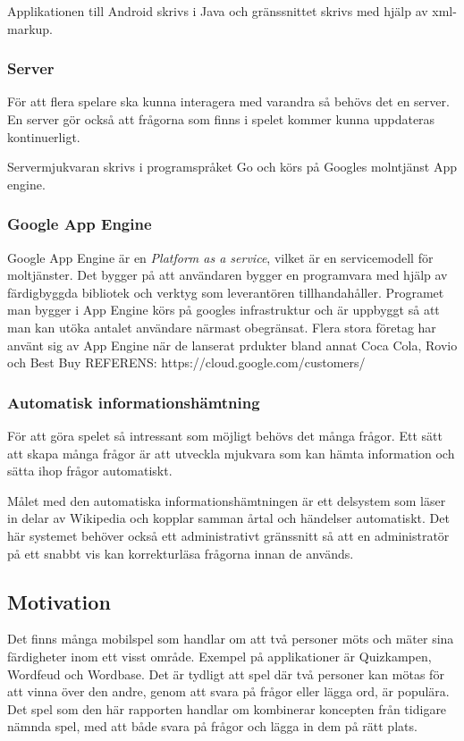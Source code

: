 \documentclass[swedish,12pt,a4paper]{article}
\begin{document}
Applikationen till Android skrivs i Java och gränssnittet skrivs med hjälp av xml-markup.

\subsubsection{Server}
För att flera spelare ska kunna interagera med varandra så behövs det en server. En server gör också att frågorna som finns i spelet kommer kunna uppdateras kontinuerligt.

Servermjukvaran skrivs i programspråket Go och körs på Googles molntjänst App engine.

\subsubsection{Google App Engine} 
Google App Engine är en \textit{Platform as a service}, vilket är en servicemodell för moltjänster. Det bygger på att användaren bygger en programvara med hjälp av färdigbyggda bibliotek och verktyg som leverantören tillhandahåller. Programet man bygger i App Engine körs på googles infrastruktur och är uppbyggt så att man kan utöka antalet användare närmast obegränsat. Flera stora företag har använt sig av App Engine när de lanserat prdukter bland annat Coca Cola, Rovio och Best Buy REFERENS: https://cloud.google.com/customers/

\subsubsection{Automatisk informationshämtning}
För att göra spelet så intressant som möjligt behövs det många frågor. Ett sätt att skapa många frågor är att utveckla mjukvara som kan hämta information och sätta ihop frågor automatiskt. 

Målet med den automatiska informationshämtningen är ett delsystem som läser in delar av Wikipedia och kopplar samman årtal och händelser automatiskt. Det här systemet behöver också ett administrativt gränssnitt så att en administratör på ett snabbt vis kan korrekturläsa frågorna innan de används.

\subsection{Motivation}
Det finns många mobilspel som handlar om att två personer möts och mäter sina färdigheter inom ett visst område. Exempel på applikationer är Quizkampen, Wordfeud och Wordbase. Det är tydligt att spel där två personer kan mötas för att vinna över den andre, genom att svara på frågor eller lägga ord, är populära. Det spel som den här rapporten handlar om kombinerar koncepten från tidigare nämnda spel, med att både svara på frågor och lägga in dem på rätt plats. 
\end{document}
